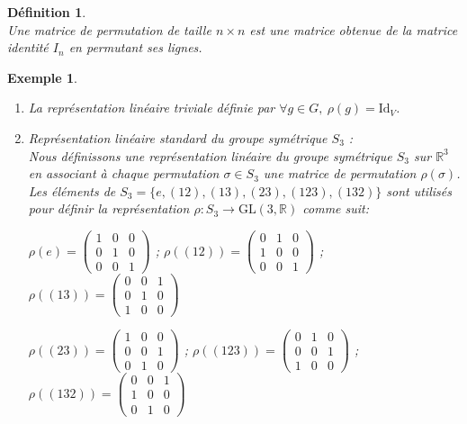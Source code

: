 \documentclass[a4paper, 14pt]{report}
\newtheorem{definition}{Définition}[section]
\newtheorem{example}{Exemple}[section]
\begin{document}
\begin{onehalfspace}
{			\begin{definition} \cite{cheung2018algebre}\\
Une matrice de permutation de taille \( n \times n \) est une matrice obtenue de la matrice identité \( I_n \) en permutant ses lignes.	
			\end{definition}
			
			
			\begin{example}\
				\begin{enumerate}
					\item La représentation linéaire triviale définie par \(\forall g \in G, \ \rho(g) = \mathrm{Id}_V\).
					\item Représentation linéaire standard du groupe symétrique \( S_3 \) :\\
					Nous définissons une représentation linéaire du groupe symétrique \( S_3 \) sur \( \mathbb{R}^3 \) en associant à chaque permutation \( \sigma \in S_3 \) une matrice de permutation \( \rho(\sigma) \). Les éléments de \( S_3 = \{e, (12), (13), (23), (123), (132)\} \) sont utilisés pour définir la représentation \( \rho : S_3 \to \mathrm{GL}(3, \mathbb{R}) \) comme suit:
					
					\(	\rho(e) = \begin{pmatrix}
						1 & 0 & 0 \\
						0 & 1 & 0 \\
						0 & 0 & 1
					\end{pmatrix} 
					\) 	
					;
					\(
					\rho((12)) = \begin{pmatrix}
						0 & 1 & 0 \\
						1 & 0 & 0 \\
						0 & 0 & 1
					\end{pmatrix}
					\)
					;		
					\(
					\rho((13)) = \begin{pmatrix}
						0 & 0 & 1 \\
						0 & 1 & 0 \\
						1 & 0 & 0
					\end{pmatrix}
					\)
					
					
					\(
					\rho((23)) = \begin{pmatrix}
						1 & 0 & 0 \\
						0 & 0 & 1 \\
						0 & 1 & 0
					\end{pmatrix}
					\)
					;
					\(
					\rho((123)) = \begin{pmatrix}
						0 & 1 & 0 \\
						0 & 0 & 1 \\
						1 & 0 & 0
					\end{pmatrix}
					\)
					;		
					\(
					\rho((132)) = \begin{pmatrix}
						0 & 0 & 1 \\
						1 & 0 & 0 \\
						0 & 1 & 0
					\end{pmatrix}
					\)
					

\end{enumerate}
\end{example}}
\end{onehalfspace}
\end{document}
